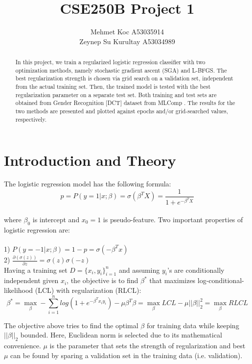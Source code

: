 \documentclass[a4paper]{article}
\title{CSE250B Project 1}
\author{Mehmet Koc A53035914\\Zeynep Su Kurultay A53034989}
\newcommand{\pder}[2]{\frac{\partial#1}{\partial#2}}
\begin{document}
\maketitle


\begin{abstract}
In this project, we train a regularized logistic regression classifier with two optimization methods, namely stochastic gradient ascent (SGA) and L-BFGS. The best regularization strength is chosen via grid search on a validation set, independent from the actual training set. Then, the trained model is tested with the best regularization parameter on a separate test set. Both training and test sets are obtained from Gender Recognition [DCT] dataset from MLComp \cite{Label1}. The results for the two methods are presented and plotted against epochs and/or grid-searched values, respectively.
\end{abstract}

\section{Introduction and Theory}

 The logistic regression model has the following formula:
 \\$$p = P(y=1|x;\beta) = \sigma(\beta^{T}X) = \frac{1}{1+e^{-\beta^{T}X}}$$\\
 where $\beta_0$ is intercept and $x_0 = 1$ is pseudo-feature.
 Two important properties of logistic regression are:\\\\
 1) $P(y=-1|x;\beta)=1-p=\sigma(-\beta^{T}x)$\\
 2) $\pder{(\sigma (z))}{z} = \sigma(z) \sigma(-z)$\\
 
 Having a training set $D = \{x_i , y_i\}_{i=1}^{n}$ and assuming $y_i$'s are conditionally independent given $x_i$, the objective is to find $\beta^*$ that maximizes log-conditional-likelihood (LCL) with regularization (RLCL):
 $$\beta^{*} = \max_{\beta} - \sum_{i=1}^{n} log(1+e^{-\beta^{T}x_{i}y_{i}}) - \mu \beta^{T} \beta = \max_{\beta} LCL - \mu ||\beta||_{2}^{2} = \max_{\beta} RLCL $$
 
 The objective above tries to find the optimal $\beta$ for training data while keeping $||\beta||_{2}$ bounded. Here, Euclidean norm is selected due to its mathematical convenience. $\mu$ is the parameter that sets the strength of regularization and best $\mu$ can be found by sparing a validation set in the training data (i.e. validation). \\\\
 
\end{document}
